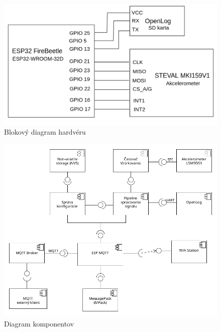 \begin{figure}[h]
	\centering
	\includegraphics[width=\textwidth]{figures/design/block-circuit-diagram.png}
	\caption{Blokový diagram hardvéru}
\end{figure}

\begin{figure}[h]
	\centering
	\includegraphics[width=\textwidth]{figures/design/components.png}
	\caption{Diagram komponentov}
\end{figure}


